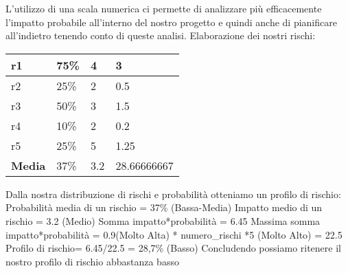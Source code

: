 		L’utilizzo di una scala numerica ci permette di analizzare più efficacemente l’impatto probabile all’interno del nostro progetto e quindi anche di pianificare all’indietro tenendo conto di queste analisi.
		Elaborazione dei nostri rischi:
		\newline \newline
		\begin{tabularx}{\textwidth}{|X|X|X|X|}
			\hline
			r1 & 75\% & 4 & 3 \\
			\hline
			r2 &  25\%  & 2  & 0.5 \\
			\hline
			r3  & 50\%  & 3  & 1.5 \\
			\hline
			r4  & 10\% &  2 &  0.2 \\
			\hline
			r5  & 25\%  & 5  & 1.25 \\
			\hline
			\textbf{Media}  & 37\% &  3.2 &  28.66666667\\
			\hline
		\end{tabularx}
		\newline \newline
		Dalla nostra distribuzione di rischi e probabilità otteniamo un profilo di rischio:
		Probabilità media di un rischio = 37\% (Bassa-Media)
		Impatto medio di un rischio = 3.2 (Medio)
		Somma impatto*probabilità = 6.45
		Massima somma impatto*probabilità = 0.9(Molto Alta) * numero\_rischi *5 (Molto Alto) = 22.5
		Profilo di rischio= 6.45/22.5 = 28,7\% (Basso)
		Concludendo possiamo ritenere il nostro profilo di rischio abbastanza basso